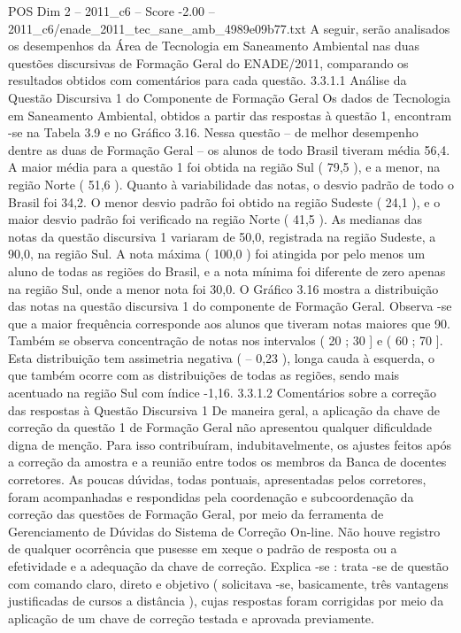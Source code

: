 \begin{textsample}{POS Dim 2 – 2011\_c6 – Score -2.00 – 2011\_c6/enade\_2011\_tec\_sane\_amb\_4989e09b77.txt}
A seguir, serão analisados os desempenhos da Área de Tecnologia em Saneamento Ambiental nas duas questões discursivas de Formação Geral do ENADE/2011, comparando os resultados obtidos com comentários para cada questão. 3.3.1.1 Análise da Questão Discursiva 1 do Componente de Formação Geral Os dados de Tecnologia em Saneamento Ambiental, obtidos a partir das respostas à questão 1, encontram -se na Tabela 3.9 e no Gráfico 3.16.
Nessa questão – de melhor desempenho dentre as duas de Formação Geral – os alunos de todo Brasil tiveram média 56,4.
A maior média para a questão 1 foi obtida na região Sul ( 79,5 ), e a menor, na região Norte ( 51,6 ).
Quanto à variabilidade das notas, o desvio padrão de todo o Brasil foi 34,2.
O menor desvio padrão foi obtido na região Sudeste ( 24,1 ), e o maior desvio padrão foi verificado na região Norte ( 41,5 ).
As medianas das notas da questão discursiva 1 variaram de 50,0, registrada na região Sudeste, a 90,0, na região Sul.
A nota máxima ( 100,0 ) foi atingida por pelo menos um aluno de todas as regiões do Brasil, e a nota mínima foi diferente de zero apenas na região Sul, onde a menor nota foi 30,0.
O Gráfico 3.16 mostra a distribuição das notas na questão discursiva 1 do componente de Formação Geral.
Observa -se que a maior frequência corresponde aos alunos que tiveram notas maiores que 90.
Também se observa concentração de notas nos intervalos ( 20 ; 30 ] e ( 60 ; 70 ].
Esta distribuição tem assimetria negativa ( – 0,23 ), longa cauda à esquerda, o que também ocorre com as distribuições de todas as regiões, sendo mais acentuado na região Sul com índice -1,16. 3.3.1.2 Comentários sobre a correção das respostas à Questão Discursiva 1 De maneira geral, a aplicação da chave de correção da questão 1 de Formação Geral não apresentou qualquer dificuldade digna de menção.
Para isso contribuíram, indubitavelmente, os ajustes feitos após a correção da amostra e a reunião entre todos os membros da Banca de docentes corretores.
As poucas dúvidas, todas pontuais, apresentadas pelos corretores, foram acompanhadas e respondidas pela coordenação e subcoordenação da correção das questões de Formação Geral, por meio da ferramenta de Gerenciamento de Dúvidas do Sistema de Correção On-line.
Não houve registro de qualquer ocorrência que pusesse em xeque o padrão de resposta ou a efetividade e a adequação da chave de correção.
Explica -se : trata -se de questão com comando claro, direto e objetivo ( solicitava -se, basicamente, três vantagens justificadas de cursos a distância ), cujas respostas foram corrigidas por meio da aplicação de um chave de correção testada e aprovada previamente.

\end{textsample}
